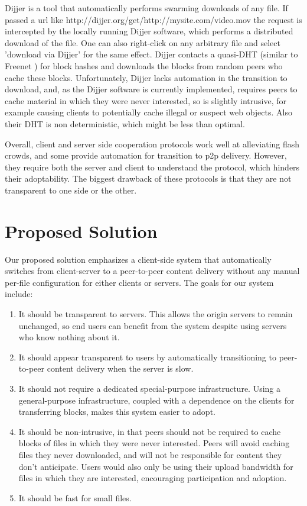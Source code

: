 Dijjer \cite{dijjer} is a tool that automatically performs swarming downloads of any file.  If passed a url like http://dijjer.org/get/http://mysite.com/video.mov the request is intercepted by the locally running Dijjer software, which performs a distributed download of the file.  One can also right-click on any arbitrary file and select 'download via Dijjer' for the same effect.  Dijjer contacts a quasi-DHT (similar to Freenet \cite{freenet}) for block hashes and downloads the blocks from random peers who cache these blocks.  Unfortunately, Dijjer lacks automation in the transition to download, and, as the Dijjer software is currently implemented, requires peers to cache material in which they were never interested, so is slightly intrusive, for example causing clients to potentially cache illegal or suspect web objects.  Also their DHT is non deterministic, which might be less than optimal.

Overall, client and server side cooperation protocols work well at alleviating flash crowds, and some provide automation for transition to p2p delivery.  However, they require both the server and client to understand the protocol, which hinders their adoptability.  The biggest drawback of these protocols is that they are not transparent to one side or the other.

\section {Proposed Solution}\label{section:solution}
Our proposed solution emphasizes a client-side system that automatically switches from client-server to a peer-to-peer content delivery without any manual per-file configuration for either clients or servers.  The goals for our system include:
\begin{enumerate}
\item It should be transparent to servers.  This allows the origin servers to remain unchanged, so end users can benefit from the system despite using servers who know nothing about it.
\item It should appear transparent to users by automatically transitioning to peer-to-peer content delivery when the server is slow.
\item It should not require a dedicated special-purpose infrastructure.  Using a general-purpose infrastructure, coupled with a dependence on the clients for transferring blocks, makes this system easier to adopt.
\item It should be non-intrusive, in that peers should not be required to cache blocks of files in which they were never interested.  Peers will avoid caching files they never downloaded, and will not be responsible for content they don't anticipate.  Users would also only be using their upload bandwidth for files in which they are interested, encouraging participation and adoption.
\item It should be fast for small files.
\end{enumerate}

